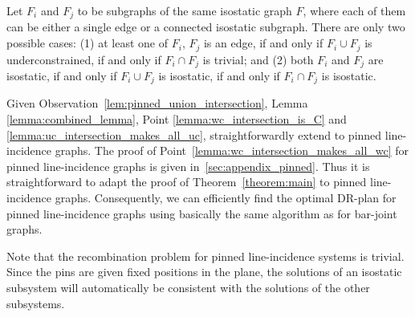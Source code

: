 \begin{observation}
\label{lem:pinned_union_intersection}
    Let $F_i$ and $F_j$ to be subgraphs of the same isostatic graph $F$, where each of them can be either a single edge or a connected isostatic subgraph. There are only two possible cases:
    (1) at least one of $F_i$, $F_j$ is an edge, if and only if $F_i \cup F_j$ is underconstrained, if and only if $F_i \cap F_j$ is trivial; and (2) both $F_i$ and $F_j$ are isostatic, if and only if $F_i \cup F_j$ is isostatic, if and only if $F_i \cap F_j$ is isostatic.
\end{observation}

Given Observation~\ref{lem:pinned_union_intersection}, %
Lemma \ref{lemma:combined_lemma}, Point \ref{lemma:wc_intersection_is_C} and \ref{lemma:uc_intersection_makes_all_uc}, straightforwardly extend to pinned line-incidence graphs. The proof of Point~\ref{lemma:wc_intersection_makes_all_wc} for pinned line-incidence graphs is given in~\ref{sec:appendix_pinned}.
Thus it is straightforward to adapt the proof of Theorem~\ref{theorem:main} to  pinned line-incidence graphs.
%
Consequently, we can efficiently find the optimal DR-plan for  pinned line-incidence graphs using basically the same algorithm as for  bar-joint graphs.

Note that the recombination problem for pinned line-incidence systems is trivial. Since the pins are given fixed positions in the plane, the solutions of an isostatic subsystem will automatically be consistent with the solutions of the other subsystems.


